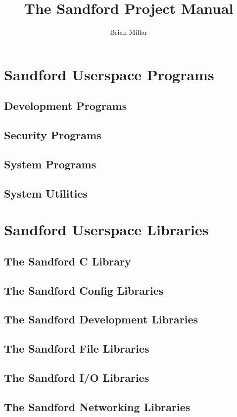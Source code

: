\documentclass[11pt,a4paper]{book}
\author{Brian Millar}
\title{The Sandford Project Manual}
\date{}
\begin{document}
    \maketitle
    \tableofcontents
    \chapter{Sandford Userspace Programs}
    \section{Development Programs}
    \section{Security Programs}
    \section{System Programs}
    \section{System Utilities}
    \chapter{Sandford Userspace Libraries}
    \section{The Sandford C Library}
    \section{The Sandford Config Libraries}
    \section{The Sandford Development Libraries}
    \section{The Sandford File Libraries}
    \section{The Sandford I/O Libraries}
    \section{The Sandford Networking Libraries}
\end{document}
